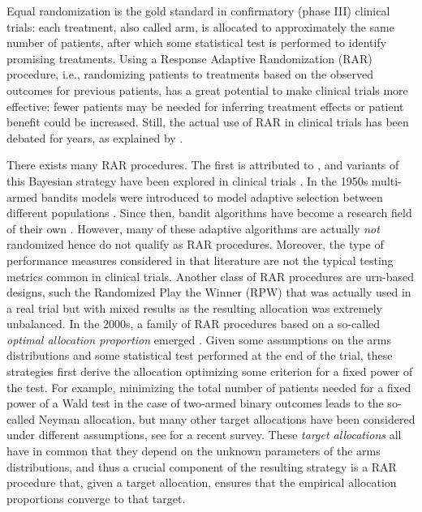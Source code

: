 Equal randomization is the gold standard in confirmatory (phase III) clinical trials: each treatment, also called arm, is allocated to approximately the same number of patients, after which some statistical test is performed to identify promising treatments. Using a Response Adaptive Randomization (RAR) procedure, i.e., randomizing patients to treatments based on the observed outcomes for previous patients, has a great potential to make clinical trials more effective: fewer patients may be needed for inferring treatment effects or patient benefit could be increased. Still, the actual use of RAR in clinical trials has been debated for years, as explained  by \cite{Villar23Review}.

There exists many RAR procedures. The first is attributed to \citep{Thompson33}, and variants of this Bayesian strategy have been explored in clinical trials \citep{Thall07}. In the 1950s multi-armed bandits models were introduced to model adaptive selection between different populations \citep{Robbins52Freq}. Since then, bandit algorithms have become a research field of their own \citep{BanditBook}. However, many of these adaptive algorithms are actually \emph{not} randomized hence do not qualify as RAR procedures. Moreover, the type of performance measures considered in that literature are not the typical testing metrics common in clinical trials. Another class of RAR procedures are urn-based designs, such the Randomized Play the Winner (RPW) \citep{WeiDurham78RPW} that was actually used in a real trial \citep{Bartlett85ECMO} but with mixed results as the resulting allocation was extremely unbalanced. In the 2000s, a family of RAR procedures based on a so-called \emph{optimal allocation proportion} emerged \citep{Rosenberger01Opt}. Given some assumptions on the arms distributions and some statistical test performed at the end of the trial, these strategies first derive the allocation optimizing some criterion for a fixed power of the test. For example, minimizing the total number of patients needed for a fixed power of a Wald test in the case of two-armed binary outcomes leads to the so-called Neyman allocation, but many other target allocations have been considered under different assumptions, see \citep{pin2024response} for a recent survey. These \emph{target allocations} all have in common that they depend on the unknown parameters of the arms distributions, and thus a crucial component of the resulting strategy is a RAR procedure that, given a target allocation, ensures that the empirical allocation proportions converge to that target.

